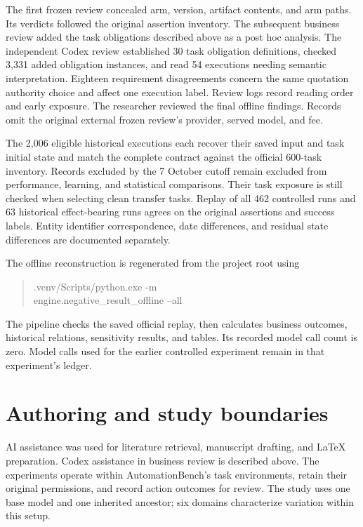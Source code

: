The first frozen review concealed arm, version, artifact contents, and arm paths. Its verdicts followed the original assertion inventory. The subsequent business review added the task obligations described above as a post hoc analysis. The independent Codex review established 30 task obligation definitions, checked 3,331 added obligation instances, and read 54 executions needing semantic interpretation. Eighteen requirement disagreements concern the same quotation authority choice and affect one execution label. Review logs record reading order and early exposure. The researcher reviewed the final offline findings. Records omit the original external frozen review's provider, served model, and fee.

\balance
The 2,006 eligible historical executions each recover their saved input and task initial state and match the complete contract against the official 600-task inventory. Records excluded by the 7 October cutoff remain excluded from performance, learning, and statistical comparisons. Their task exposure is still checked when selecting clean transfer tasks. Replay of all 462 controlled runs and 63 historical effect-bearing runs agrees on the original assertions and success labels. Entity identifier correspondence, date differences, and residual state differences are documented separately.

The offline reconstruction is regenerated from the project root using
\begin{quote}
\small\ttfamily
.venv/Scripts/python.exe -m\\
engine.negative\_result\_offline --all
\end{quote}
The pipeline checks the saved official replay, then calculates business outcomes, historical relations, sensitivity results, and tables. Its recorded model call count is zero. Model calls used for the earlier controlled experiment remain in that experiment's ledger.

\section{Authoring and study boundaries}

AI assistance was used for literature retrieval, manuscript drafting, and LaTeX preparation. Codex assistance in business review is described above. The experiments operate within AutomationBench's task environments, retain their original permissions, and record action outcomes for review. The study uses one base model and one inherited ancestor; six domains characterize variation within this setup.
